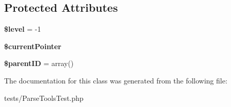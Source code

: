 \subsection*{\-Protected \-Attributes}
\begin{DoxyCompactItemize}
\item 
\hypertarget{class_super_stack_abd32cc82c6a3f79491987de36ad580ca}{
{\bfseries \$level} = -\/1}
\label{class_super_stack_abd32cc82c6a3f79491987de36ad580ca}

\item 
\hypertarget{class_super_stack_ac351d413360fcfde69afc645f896375c}{
{\bfseries \$current\-Pointer}}
\label{class_super_stack_ac351d413360fcfde69afc645f896375c}

\item 
\hypertarget{class_super_stack_a956a5cfcdcd329658ab854d3967bd355}{
{\bfseries \$parent\-I\-D} = array()}
\label{class_super_stack_a956a5cfcdcd329658ab854d3967bd355}

\end{DoxyCompactItemize}


\-The documentation for this class was generated from the following file\-:\begin{DoxyCompactItemize}
\item 
tests/\-Parse\-Tools\-Test.\-php\end{DoxyCompactItemize}
